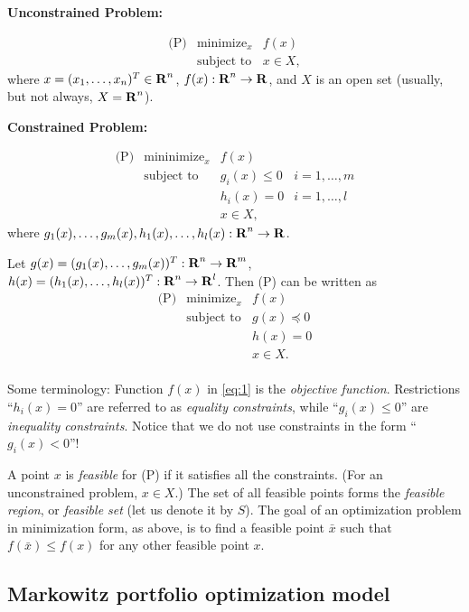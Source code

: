 \documentclass[11pt]{article}
\newcommand{\st}{\text{subject to}}
\begin{document}
\textbf{Unconstrained Problem:}

$$
\begin{array}{ccl}
\text{(P)}&\text{minimize}_x&f(x)\\
&\st&x\in X,
\end{array}
$$
where $x=(x_1,\ldots,x_n)^T\in{\mbox{\textbf{R}}}^n$, $f(x):{\mbox{\textbf{R}}}^n\rightarrow{\mbox{\textbf{R}}}$,
and $X$ is an open set (usually, but not always, $X={\mbox{\textbf{R}}}^n$).

\textbf{Constrained Problem:}

$$
\begin{array}{ccll}
\text{(P)}&\text{mininimize}_x&f(x)&\\
&\st&g_i(x)\le 0&i=1,\ldots,m\\ 
&&h_i(x)=0&i=1,\ldots,l\\ 
&&x\in X,\end{array}
$$
where  $g_1(x),\ldots, g_m(x), h_1(x),\ldots,
h_l(x):{\mbox{\textbf{R}}}^n\rightarrow{\mbox{\textbf{R}}}$.

Let $g(x)=(g_1(x),\ldots,g_m(x))^T:{\mbox{\textbf{R}}}^n\rightarrow{\mbox{\textbf{R}}}^m$,
$h(x)=(h_1(x),\ldots,h_l(x))^T:{\mbox{\textbf{R}}}^n\rightarrow{\mbox{\textbf{R}}}^l$. Then (P) can
be written as
\begin{equation}\label{eq:1}
\begin{array}{ccl}
\text{(P)}&\text{minimize}_x&f(x)\\ 
&\st&g(x)\preceq 0\\
&&h(x)=0\\
&&x\in X. \\
\end{array}
\end{equation}

Some terminology: Function $f(x)$ in \eqref{eq:1} is the \emph{objective function}. Restrictions ``$h_i(x)=0$'' are referred to as \emph{equality constraints}, while ``$g_i(x)\le 0$'' are \emph{inequality constraints}. Notice that we do not use constraints in the form ``$g_i(x)<0$''! 

A point $x$ is \emph{feasible} for (P) if it satisfies all the constraints.  (For an unconstrained problem, $x\in X$.) The set of all feasible points forms the \emph{feasible region}, or \emph{feasible set} (let us denote it by $S$). The goal of an optimization problem in minimization form, as above, is to find a feasible point $\bar x$ such that $f(\bar x)\le f(x)$ for any other feasible point $x$.


\subsection{Markowitz portfolio optimization model}
\end{document}
